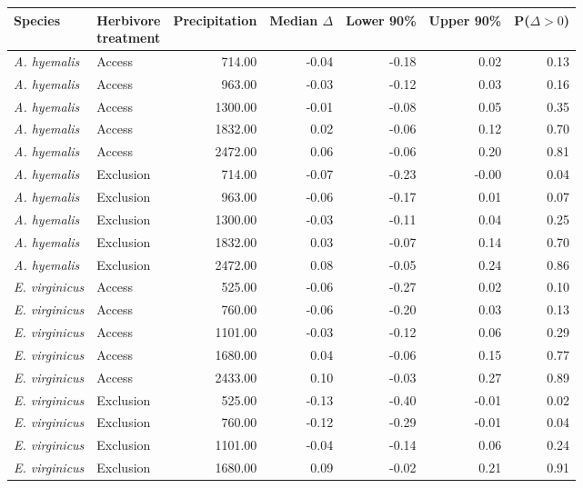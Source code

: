 \begin{tabular}{llrrrrr}
  \hline
Species & \makecell{Herbivore \\ treatment} & Precipitation & Median $\Delta$ & Lower 90\% & Upper 90\% & P($\Delta>0$) \\ 
  \hline
\textit{A. hyemalis} & Access & 714.00 & -0.04 & -0.18 & 0.02 & 0.13 \\ 
  \textit{A. hyemalis} & Access & 963.00 & -0.03 & -0.12 & 0.03 & 0.16 \\ 
  \textit{A. hyemalis} & Access & 1300.00 & -0.01 & -0.08 & 0.05 & 0.35 \\ 
  \textit{A. hyemalis} & Access & 1832.00 & 0.02 & -0.06 & 0.12 & 0.70 \\ 
  \textit{A. hyemalis} & Access & 2472.00 & 0.06 & -0.06 & 0.20 & 0.81 \\ 
  \textit{A. hyemalis} & Exclusion & 714.00 & -0.07 & -0.23 & -0.00 & 0.04 \\ 
  \textit{A. hyemalis} & Exclusion & 963.00 & -0.06 & -0.17 & 0.01 & 0.07 \\ 
  \textit{A. hyemalis} & Exclusion & 1300.00 & -0.03 & -0.11 & 0.04 & 0.25 \\ 
  \textit{A. hyemalis} & Exclusion & 1832.00 & 0.03 & -0.07 & 0.14 & 0.70 \\ 
  \textit{A. hyemalis} & Exclusion & 2472.00 & 0.08 & -0.05 & 0.24 & 0.86 \\ 
  \textit{E. virginicus} & Access & 525.00 & -0.06 & -0.27 & 0.02 & 0.10 \\ 
  \textit{E. virginicus} & Access & 760.00 & -0.06 & -0.20 & 0.03 & 0.13 \\ 
  \textit{E. virginicus} & Access & 1101.00 & -0.03 & -0.12 & 0.06 & 0.29 \\ 
  \textit{E. virginicus} & Access & 1680.00 & 0.04 & -0.06 & 0.15 & 0.77 \\ 
  \textit{E. virginicus} & Access & 2433.00 & 0.10 & -0.03 & 0.27 & 0.89 \\ 
  \textit{E. virginicus} & Exclusion & 525.00 & -0.13 & -0.40 & -0.01 & 0.02 \\ 
  \textit{E. virginicus} & Exclusion & 760.00 & -0.12 & -0.29 & -0.01 & 0.04 \\ 
  \textit{E. virginicus} & Exclusion & 1101.00 & -0.04 & -0.14 & 0.06 & 0.24 \\ 
  \textit{E. virginicus} & Exclusion & 1680.00 & 0.09 & -0.02 & 0.21 & 0.91 \\ 

\end{tabular}
